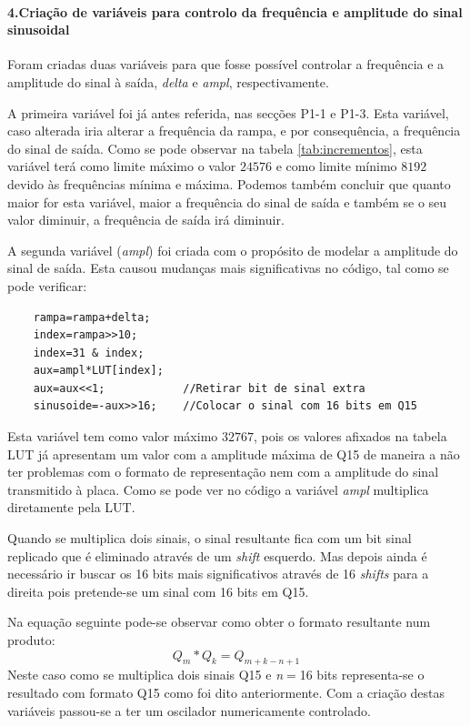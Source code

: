 \documentclass[11pt]{article}
\numberwithin{equation}{section}
\begin{document}
\paragraph{4.Criação de variáveis para controlo da frequência e amplitude do sinal sinusoidal} \hspace{0pt}

Foram criadas duas variáveis para que fosse possível controlar a frequência e a amplitude do sinal à saída, \textit{delta} e \textit{ampl}, respectivamente.

A primeira variável foi já antes referida, nas secções P1-1 e P1-3. Esta variável, caso alterada iria alterar a frequência da rampa, e por consequência, a frequência do sinal de saída. Como se pode observar na tabela \ref{tab:incrementos}, esta variável terá como limite máximo o valor $ 24576 $ e como limite mínimo $ 8192 $ devido às frequências mínima e máxima. Podemos também concluir que quanto maior for esta variável, maior a frequência do sinal de saída e também se o seu valor diminuir, a frequência de saída irá diminuir.

A segunda variável (\textit{ampl}) foi criada com o propósito de modelar a amplitude do sinal de saída. Esta causou mudanças mais significativas no código, tal como se pode verificar:

\begin{lstlisting}
	rampa=rampa+delta;
	index=rampa>>10;
	index=31 & index;        
	aux=ampl*LUT[index];
	aux=aux<<1;            //Retirar bit de sinal extra
	sinusoide=-aux>>16;    //Colocar o sinal com 16 bits em Q15
\end{lstlisting}

Esta variável tem como valor máximo $ 32767 $, pois os valores afixados na tabela LUT já apresentam um valor com a amplitude máxima de Q15 de maneira a não ter problemas com o formato de representação nem com a amplitude do sinal transmitido à placa.
Como se pode ver no código a variável \textit{ampl} multiplica diretamente pela LUT. 
\vspace{2 mm}

Quando se multiplica dois sinais, o sinal resultante fica com um bit sinal replicado que é eliminado através de um \textit{shift} esquerdo. Mas depois ainda é necessário ir buscar os 16 bits mais significativos através de 16 \textit{shifts} para a direita pois pretende-se um sinal com 16 bits em Q15. 

Na equação seguinte pode-se observar como obter o formato resultante num produto:
\begin{equation}
Q_{m} * Q_{k}=Q_{m+k-n+1}
\end{equation}
Neste caso como se multiplica dois sinais Q15 e \textit{n}$=$16 bits representa-se o resultado com formato Q15 como foi dito anteriormente.
Com a criação destas variáveis passou-se a ter um oscilador numericamente controlado.
\end{document}
